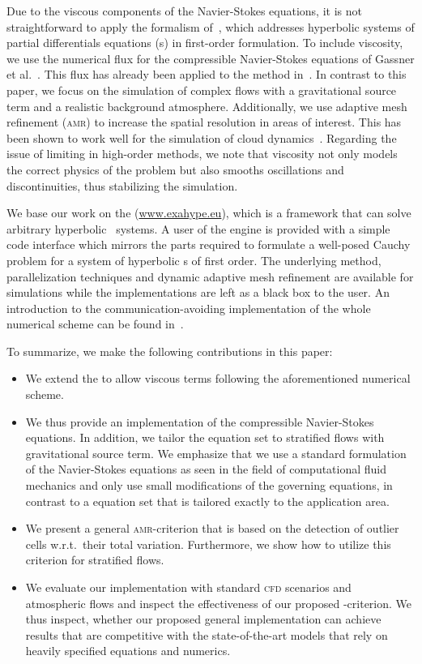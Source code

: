 \documentclass[runningheads]{llncs}
\begin{document}
Due to the viscous components of the Navier-Stokes equations, it is not straightforward to apply the \aderdg{} formalism of~\cite{dumbser2008unified}, which addresses hyperbolic systems of partial differentials equations (\pde{}s) in first-order formulation.
To include viscosity, we use the numerical flux for the compressible Navier-Stokes equations of Gassner et al.~\cite{gassner2008discontinuous}.
This flux has already been applied to the \aderdg{} method in~\cite{dumbser2010arbitrary}.
In contrast to this paper, we focus on the simulation of complex flows with a gravitational source term and a realistic background atmosphere.
Additionally, we use adaptive mesh refinement (\textsc{amr}) to increase the spatial resolution in areas of interest.
This has been shown to work well for the simulation of cloud dynamics~\cite{muller2010adaptive}.
Regarding the issue of limiting in high-order \dg{} methods, we note that viscosity not only models the correct physics of the problem but also smooths oscillations and discontinuities, thus stabilizing the simulation.

We base our work on the \exahypeengine{} (\url{www.exahype.eu}), which is a framework that can solve arbitrary hyperbolic \pde\ systems.
A user of the engine is provided with a simple code interface which mirrors the parts required to formulate a well-posed Cauchy problem for a system of hyperbolic \pde{}s of first order.
The underlying \aderdg{} method, parallelization techniques and dynamic adaptive mesh refinement are available for simulations while the implementations are left as a black box to the user.
An introduction to the communication-avoiding implementation of the whole numerical scheme can be found in~\cite{charrier2018stop}.

To summarize, we make the following contributions in this paper:%
\begin{itemize}%
\item We extend the \exahypeengine{} to allow viscous terms following the aforementioned numerical scheme.
\item We thus provide an implementation of the compressible Navier-Stokes equations.
  In addition, we tailor the equation set to stratified flows with gravitational source term.
  We emphasize that we use a standard formulation of the Navier-Stokes equations as seen in the field of computational fluid mechanics and only use small modifications of the governing equations, in contrast to a equation set that is tailored exactly to the application area.
\item We present a general \textsc{amr}-criterion that is based on the detection of outlier cells w.r.t.\ their total variation.
  Furthermore, we show how to utilize this criterion for stratified flows.
\item We evaluate our implementation with standard \textsc{cfd} scenarios and atmospheric flows and inspect the effectiveness of our proposed \amr{}-criterion.
  We thus inspect, whether our proposed general implementation can achieve results that are competitive with the state-of-the-art models that rely on heavily specified equations and numerics.
\end{itemize}
%
\end{document}
